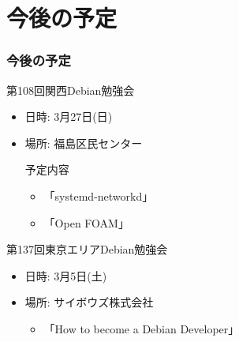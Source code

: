 \documentclass[cjk,dvipdfmx,10pt,compress,%
hyperref={bookmarks=true,bookmarksnumbered=true,bookmarksopen=false,%
colorlinks=false,%
pdftitle={第 107 回 関西 Debian 勉強会},%
pdfauthor={倉敷・のがた・佐々木・かわだ},%
pdfsubject={資料},%
}]{beamer}
\begin{document}
\section{今後の予定}
\begin{frame}[fragile]
  \frametitle{今後の予定}

  \begin{block}{第108回関西Debian勉強会}
    \begin{itemize}
    \item 日時: 3月27日(日)
    \item 場所: 福島区民センター
      \begin{block}{予定内容}
        \begin{itemize}
        \item 「systemd-networkd」
        \item 「Open FOAM」
        \end{itemize}
      \end{block}
    \end{itemize}
  \end{block}

  \begin{block}{第137回東京エリアDebian勉強会}
    \begin{itemize}
    \item 日時: 3月5日(土)
    \item 場所: サイボウズ株式会社
      \begin{itemize}
      \item 「How to become a Debian Developer」
      \end{itemize}
    \end{itemize}
  \end{block}

\end{frame}

\takahashi[50]{  }
\end{document}
